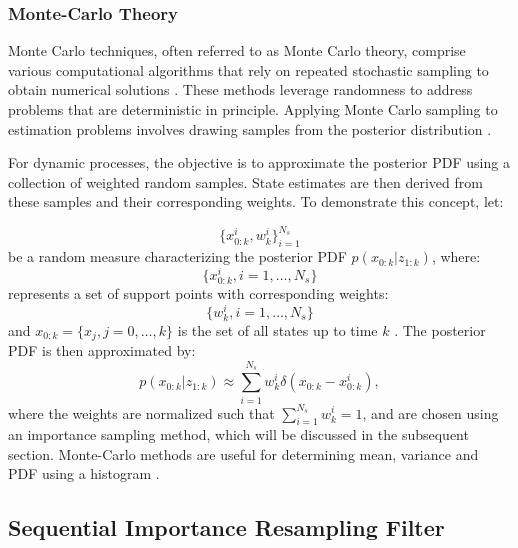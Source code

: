 \subsubsection{Monte-Carlo Theory}
Monte Carlo techniques, often referred to as Monte Carlo theory, comprise various computational algorithms that rely on repeated stochastic sampling to obtain numerical solutions \cite{Kay}. These methods leverage randomness to address problems that are deterministic in principle. Applying Monte Carlo sampling to estimation problems involves drawing samples from the posterior distribution \cite{Lang2007}.


For dynamic processes, the objective is to approximate the posterior \ac{PDF} using a collection of weighted random samples. State estimates are then derived from these samples and their corresponding weights. To demonstrate this concept, let:

\begin{equation}
    \{x^i_{0:k}, w^i_k\}_{i=1}^{N_s}
\end{equation}
be a random measure characterizing the posterior \ac{PDF} \(p(x_{0:k} | z_{1:k})\), where:
\begin{equation}
    \{x^i_{0:k}, i=1,\dots,N_s\}    
\end{equation}
represents a set of support points with corresponding weights: 
\begin{equation}
    \{w^i_k, i=1,\dots,N_s\}
\end{equation}
and \(x_{0:k} = \{x_j, j=0,\dots,k\}\) is the set of all states up to time \(k\) \cite{Arulampalam2007}. The posterior \ac{PDF} is then approximated by:
\begin{equation}
    p(x_{0:k} | z_{1:k}) \approx \sum_{i=1}^{N_s} w^i_k \delta(x_{0:k} - x^i_{0:k}),
\end{equation}
where the weights are normalized such that \(\sum_{i=1}^{N_s} w^i_k = 1\), and are chosen using an importance sampling method, which will be discussed in the subsequent section. Monte-Carlo methods are useful for determining mean, variance and \ac{PDF} using a histogram \cite{Kay}.

\subsection{Sequential Importance Resampling Filter}

